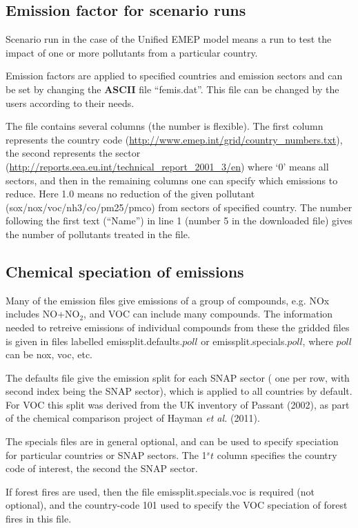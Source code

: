 \subsection{Emission factor for scenario runs}\label{sec:femis}
Scenario run in the case of the Unified EMEP model means a run to test
the impact of one or more pollutants from a particular
country. 

Emission factors are applied to specified countries and
emission sectors and can be set by changing the {\bf ASCII} file
``femis.dat''. 
This file can be changed by the users according to their needs.

The file contains several columns (the number is flexible). The first column represents
the country code (\url{http://www.emep.int/grid/country_numbers.txt}),
the second represents the sector
(\url{http://reports.eea.eu.int/technical_report_2001_3/en}) 
where `0' means all sectors, and then in the remaining
 columns one can specify
which emissions to reduce. Here 1.0 means no reduction of the given
pollutant 
(sox/nox/voc/nh3/co/pm25/pmco) from sectors of specified country. The
number following the first text (``Name'') in line 1 (number 5 in
the downloaded file) gives the number of pollutants treated in the file.


\subsection{Chemical speciation of emissions}

Many of the emission files give emissions of a group of compounds, e.g.
NOx includes NO+NO$_2$, and VOC can include many compounds. The information
needed to retreive emissions of individual compounds from these the
gridded files is given in  files labelled emissplit.defaults.$poll$ or
emissplit.specials.$poll$, where $poll$ can be nox, voc, etc.

The defaults file give the emission split for each SNAP sector (
one per row, with second index being the SNAP sector), which
is applied to all countries by default. For VOC this split
was derived from the UK inventory of Passant (2002),
as part of the chemical comparison project of Hayman {\sl et al.} (2011).

The specials files are in general optional, and can be used to specify
speciation for particular countries or SNAP sectors. The
1${^st}$ column specifies the country code of interest, the second the SNAP sector. 

If forest fires are used, then the file emissplit.specials.voc is required
(not optional), and the country-code 101 used to specify the VOC speciation
of forest fires in this file.

